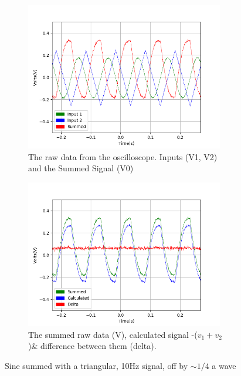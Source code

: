 \begin{figure}[h!]
\centering
\begin{subfigure}[t]{.475\textwidth}
  \centering
  \includegraphics[width=0.95\textwidth, height=0.20\textheight]{figures/Summing/scope_8raw.png}
  \caption{The raw data from the oscilloscope. Inputs (V1, V2) and the Summed Signal (V0)}
 \label{fig:sum_8_og_data}
\end{subfigure}\hfill
\begin{subfigure}[t]{.475\textwidth}
  \centering
  \includegraphics[width=0.95\textwidth, height=0.20\textheight]{figures/Summing/scope_8.png}
  \caption{The summed raw data (V), calculated signal -($v_1 + v_2$)\& difference between them (delta).}
\label{fig:sum_8_calc_data}
\end{subfigure}
\caption{Sine summed with a triangular, 10Hz signal, off by $\sim1/4$ a wave}
\end{figure}

